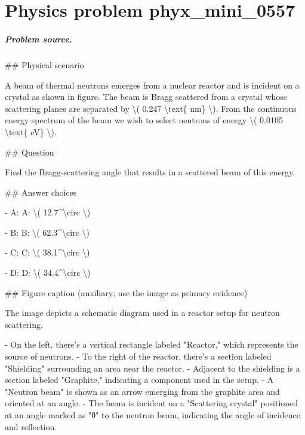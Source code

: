 
\chapter{Physics problem phyx\_mini\_0557}
\label{ch:PhyXMiniProblems_problem_phyx_mini_0557}

\paragraph{Problem source.}
\#\# Physical scenario

A beam of thermal neutrons emerges from a nuclear reactor and is incident on a crystal as shown in figure. The beam is Bragg scattered from a crystal whose scattering planes are separated by \textbackslash{}( 0.247 \textbackslash{}text\{ nm\} \textbackslash{}). From the continuous energy spectrum of the beam we wish to select neutrons of energy \textbackslash{}( 0.0105 \textbackslash{}text\{ eV\} \textbackslash{}).

\#\# Question

Find the Bragg-scattering angle that results in a scattered beam of this energy.

\#\# Answer choices

- A: A: \textbackslash{}( 12.7\textasciicircum{}\textbackslash{}circ \textbackslash{})

- B: B: \textbackslash{}( 62.3\textasciicircum{}\textbackslash{}circ \textbackslash{})

- C: C: \textbackslash{}( 38.1\textasciicircum{}\textbackslash{}circ \textbackslash{})

- D: D: \textbackslash{}( 34.4\textasciicircum{}\textbackslash{}circ \textbackslash{})

\#\# Figure caption (auxiliary; use the image as primary evidence)

The image depicts a schematic diagram used in a reactor setup for neutron scattering. 

- On the left, there's a vertical rectangle labeled "Reactor," which represents the source of neutrons.
- To the right of the reactor, there's a section labeled "Shielding" surrounding an area near the reactor.
- Adjacent to the shielding is a section labeled "Graphite," indicating a component used in the setup.
- A "Neutron beam" is shown as an arrow emerging from the graphite area and oriented at an angle.
- The beam is incident on a "Scattering crystal" positioned at an angle marked as "θ" to the neutron beam, indicating the angle of incidence and reflection.

